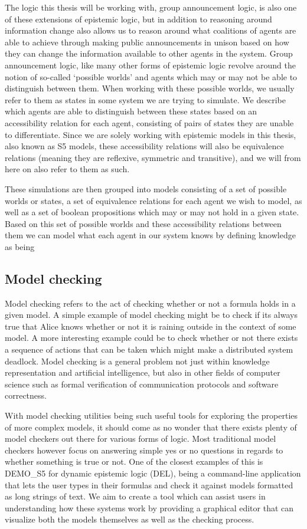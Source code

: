 The logic this thesis will be working with, group announcement logic, is also one of these extensions of epistemic logic, but in addition to reasoning around information change also allows us to reason around what coalitions of agents are able to achieve through making public announcements in unison based on how they can change the information available to other agents in the system. Group announcement logic, like many other forms of epistemic logic revolve around the notion of so-called `possible worlds' and agents which may or may not be able to distinguish between them. When working with these possible worlds, we usually refer to them as states in some system we are trying to simulate. We describe which agents are able to distinguish between these states based on an accessibility relation for each agent, consisting of pairs of states they are unable to differentiate. Since we are solely working with epistemic models in this thesis, also known as S5 models, these accessibility relations will also be equivalence relations (meaning they are reflexive, symmetric and transitive), and we will from here on also refer to them as such.

These simulations are then grouped into models consisting of a set of possible worlds or states, a set of equivalence relations for each agent we wish to model, as well as a set of boolean propositions which may or may not hold in a given state. Based on this set of possible worlds and these accessibility relations between them we can model what each agent in our system knows by defining knowledge as being 


\subsection{Model checking}

Model checking refers to the act of checking whether or not a formula holds in a given model. A simple example of model checking might be to check if its always true that Alice knows whether or not it is raining outside in the context of some model. A more interesting example could be to check whether or not there exists a sequence of actions that can be taken which might make a distributed system deadlock. Model checking is a general problem not just within knowledge representation and artificial intelligence, but also in other fields of computer science such as formal verification of communication protocols and software correctness.

With model checking utilities being such useful tools for exploring the properties of more complex models, it should come as no wonder that there exists plenty of model checkers out there for various forms of logic. Most traditional model checkers however focus on answering simple yes or no questions in regards to whether something is true or not. One of the closest examples of this is DEMO\_S5 for dynamic epistemic logic (DEL), being a command-line application that lets the user types in their formulas and check it against models formatted as long strings of text. We aim to create a tool which can assist users in understanding how these systems work by providing a graphical editor that can visualize both the models themselves as well as the checking process.


